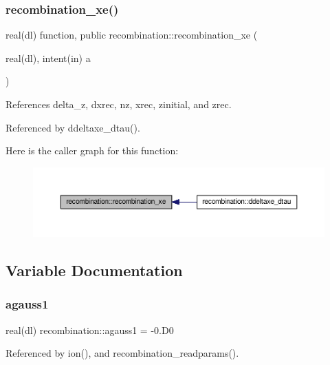 \subsubsection{\texorpdfstring{recombination\+\_\+xe()}{recombination\_xe()}}
{\footnotesize\ttfamily real(dl) function, public recombination\+::recombination\+\_\+xe (\begin{DoxyParamCaption}\item[{real(dl), intent(in)}]{a }\end{DoxyParamCaption})}



References delta\+\_\+z, dxrec, nz, xrec, zinitial, and zrec.



Referenced by ddeltaxe\+\_\+dtau().

Here is the caller graph for this function\+:
\nopagebreak
\begin{figure}[H]
\begin{center}
\leavevmode
\includegraphics[width=350pt]{namespacerecombination_a64de24be26a98919cba0095322731263_icgraph}
\end{center}
\end{figure}


\subsection{Variable Documentation}
\mbox{\label{namespacerecombination_a3656f16a64eb43f2c0cc9ede42d7739e}} 
\subsubsection{\texorpdfstring{agauss1}{agauss1}}
{\footnotesize\ttfamily real(dl) recombination\+::agauss1 = -\/0.\+D0\hspace{0.3cm}{\ttfamily [private]}}



Referenced by ion(), and recombination\+\_\+readparams().

\mbox{\label{namespacerecombination_ac630e24e5948bae78946e725278366d0}} 
